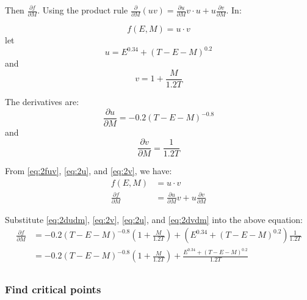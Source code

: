 \documentclass{article}
\begin{document}
Then $\frac{\partial f}{\partial M}$. Using the product rule $\frac{\partial}{\partial M}(uv) = \frac{\partial u}{\partial M}v \cdot u + u\frac{\partial v}{\partial M}$. In:

\begin{equation}\label{eq:2fuv}
  f(E, M) = u \cdot v
\end{equation}
let
\begin{equation}\label{eq:2u}
  u = E^{0.34} + \left( T - E - M \right)^{0.2}
\end{equation}
and
\begin{equation}\label{eq:2v}
  v = 1 + \frac{M}{1.2 T}
\end{equation}

The derivatives are:
\begin{equation}\label{eq:2dudm}
  \frac{\partial u}{\partial M} = - 0.2\left( T - E - M \right)^{-0.8}
\end{equation}
and
\begin{equation}\label{eq:2dvdm}
  \frac{\partial v}{\partial M} = \frac{1}{1.2 T}
\end{equation}

From \eqref{eq:2fuv}, \eqref{eq:2u}, and \eqref{eq:2v}, we have:
\begin{equation}
  \begin{split}
    f(E, M) & = u \cdot v \\
    \frac{\partial f}{\partial M} & = \frac{\partial u}{\partial M}v + u\frac{\partial v}{\partial M}
  \end{split}
\end{equation}

Substitute \eqref{eq:2dudm}, \eqref{eq:2v}, \eqref{eq:2u}, and \eqref{eq:2dvdm} into the above equation:
\begin{equation}\label{eq:2dfdm}
  \begin{split}
    \frac{\partial f}{\partial M} & = - 0.2\left( T - E - M \right)^{-0.8}\left( 1 + \frac{M}{1.2 T} \right) + \left( E^{0.34} + \left( T - E - M \right)^{0.2} \right)\frac{1}{1.2 T} \\
    & = - 0.2\left( T - E - M \right)^{-0.8}\left( 1 + \frac{M}{1.2 T} \right) + \frac{E^{0.34} + \left( T - E - M \right)^{0.2}}{1.2 T} \\
  \end{split}
\end{equation}

\subsubsection{Find critical points}
\end{document}
